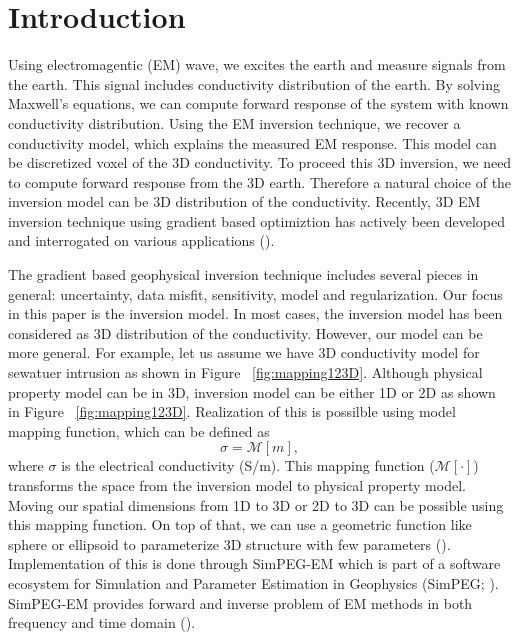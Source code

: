 \documentclass{segabs}
\begin{document}
\section{Introduction}
Using electromagentic (EM) wave, we excites the earth and measure signals from the earth. This signal includes conductivity distribution of the earth. By solving Maxwell's equations, we can compute forward response of the system with known conductivity distribution. 
Using the EM inversion technique, we recover a conductivity model, which explains the measured EM response. 
This model can be discretized voxel of the 3D conductivity. 
To proceed this 3D inversion, we need to compute forward response from the 3D earth. Therefore a natural choice of the inversion model can be 3D distribution of the conductivity. 
Recently, 3D EM inversion technique using gradient based optimiztion has actively been developed and interrogated on various applications (\cite{Doug2013,Gribenko2007,Chung2014}). 

The gradient based geophysical inversion technique includes several pieces in general: uncertainty, data misfit, sensitivity, model and regularization. Our focus in this paper is the inversion model. 
In most cases, the inversion model has been considered as 3D distribution of the conductivity. 
However, our model can be more general. For example, let us assume we have 3D conductivity model for sewatuer intrusion as shown in Figure ~\ref{fig:mapping123D}. Although physical property model can be in 3D, inversion model can be either 1D or 2D as shown in Figure ~\ref{fig:mapping123D}. Realization of this is possilble using model mapping function, which can be defined as 
\begin{equation}
  \sigma  = \mathcal{M}[m],
\end{equation}
where $\sigma$ is the electrical conductivity (S/m). This mapping function ($\mathcal{M}[\cdot]$) transforms the space from the inversion model to physical property model. Moving our spatial dimensions from 1D to 3D or 2D to 3D can be possible using this mapping function. On top of that, we can use a geometric function like sphere or ellipsoid to parameterize 3D structure with few parameters (\cite{MikeParam2014}). Implementation of this is done through SimPEG-EM which is part of a software ecosystem for Simulation and Parameter Estimation in Geophysics (SimPEG; \cite{SimPEG}). SimPEG-EM provides forward and inverse problem of EM methods in both frequency and time domain (\cite{SimPEGEM}). 
\end{document}
